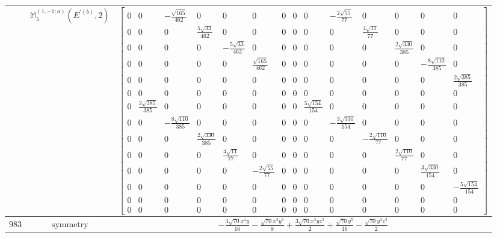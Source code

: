 \documentclass[fleqn,8pt,landscape]{jsarticle}
\begin{document}
\begin{longtable}{ccc}
$  $ & $ \mathbb{M}_{5}^{(1,-1;a)}(E^{\prime(b)},2) $ & $ \begin{bmatrix} 0 & 0 & - \frac{\sqrt{165}}{462} & 0 & 0 & 0 & 0 & 0 & 0 & - \frac{2 \sqrt{55}}{77} & 0 & 0 & 0 & 0 \\ 0 & 0 & 0 & \frac{5 \sqrt{33}}{462} & 0 & 0 & 0 & 0 & 0 & 0 & \frac{4 \sqrt{11}}{77} & 0 & 0 & 0 \\ 0 & 0 & 0 & 0 & - \frac{5 \sqrt{33}}{462} & 0 & 0 & 0 & 0 & 0 & 0 & \frac{2 \sqrt{330}}{385} & 0 & 0 \\ 0 & 0 & 0 & 0 & 0 & \frac{\sqrt{165}}{462} & 0 & 0 & 0 & 0 & 0 & 0 & - \frac{8 \sqrt{110}}{385} & 0 \\ 0 & 0 & 0 & 0 & 0 & 0 & 0 & 0 & 0 & 0 & 0 & 0 & 0 & \frac{2 \sqrt{385}}{385} \\ 0 & 0 & 0 & 0 & 0 & 0 & 0 & 0 & 0 & 0 & 0 & 0 & 0 & 0 \\ 0 & \frac{2 \sqrt{385}}{385} & 0 & 0 & 0 & 0 & 0 & 0 & \frac{5 \sqrt{154}}{154} & 0 & 0 & 0 & 0 & 0 \\ 0 & 0 & - \frac{8 \sqrt{110}}{385} & 0 & 0 & 0 & 0 & 0 & 0 & - \frac{3 \sqrt{330}}{154} & 0 & 0 & 0 & 0 \\ 0 & 0 & 0 & \frac{2 \sqrt{330}}{385} & 0 & 0 & 0 & 0 & 0 & 0 & - \frac{2 \sqrt{110}}{77} & 0 & 0 & 0 \\ 0 & 0 & 0 & 0 & \frac{4 \sqrt{11}}{77} & 0 & 0 & 0 & 0 & 0 & 0 & \frac{2 \sqrt{110}}{77} & 0 & 0 \\ 0 & 0 & 0 & 0 & 0 & - \frac{2 \sqrt{55}}{77} & 0 & 0 & 0 & 0 & 0 & 0 & \frac{3 \sqrt{330}}{154} & 0 \\ 0 & 0 & 0 & 0 & 0 & 0 & 0 & 0 & 0 & 0 & 0 & 0 & 0 & - \frac{5 \sqrt{154}}{154} \\ 0 & 0 & 0 & 0 & 0 & 0 & 0 & 0 & 0 & 0 & 0 & 0 & 0 & 0 \\ 0 & 0 & 0 & 0 & 0 & 0 & 0 & 0 & 0 & 0 & 0 & 0 & 0 & 0 \end{bmatrix} $ \\ \hline
$ 983 $ & $ \text{symmetry} $ & $ - \frac{3 \sqrt{70} x^{4} y}{16} - \frac{\sqrt{70} x^{2} y^{3}}{8} + \frac{3 \sqrt{70} x^{2} y z^{2}}{2} + \frac{\sqrt{70} y^{5}}{16} - \frac{\sqrt{70} y^{3} z^{2}}{2} $ \\

\end{longtable}
\end{document}
